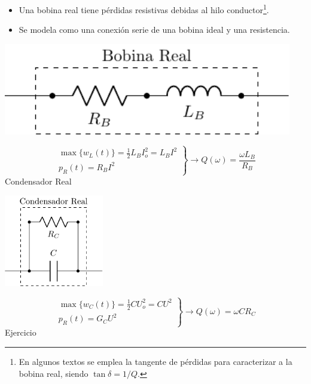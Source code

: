 \begin{itemize}
\item Una bobina real tiene pérdidas resistivas debidas al hilo conductor\footnote{En algunos textos se emplea la tangente de pérdidas para caracterizar a la bobina real, siendo \(\tan{\delta} = 1/Q\).}.
\item Se modela como una conexión serie de una bobina ideal y una resistencia.
\end{itemize}
\begin{center}
\includegraphics[height=4cm]{../figs/BobinaReal.pdf}
\end{center}

\[
  \left.
  \begin{array}{l}
    \max\{w_L(t)\} = \frac{1}{2} L_B I_o^2 = L_BI^2\\
      p_R(t) = R_B I^2
  \end{array}
  \right\} \rightarrow
  \boxed{Q(\omega) = \frac{\omega L_B}{R_B}}
\]
{Condensador Real}

\begin{center}
\includegraphics[height=4cm]{../figs/CondensadorReal.pdf}
\end{center}

\[
  \left.
  \begin{array}{l}
    \max\{w_C(t)\} = \frac{1}{2} C U_o^2 = CU^2\\
      p_R(t) = G_C U^2
  \end{array}
  \right\} \rightarrow
  \boxed{Q(\omega) = \omega C R_C}
\]
{Ejercicio}

